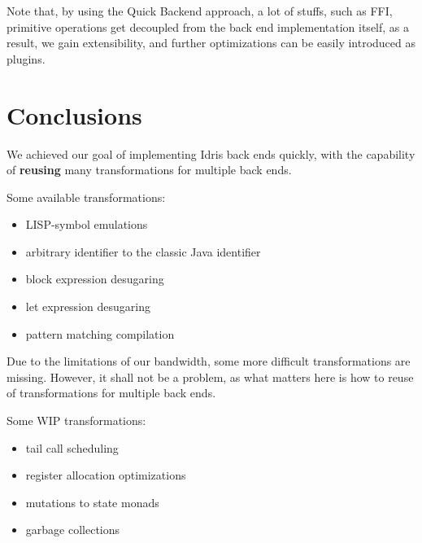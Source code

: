 \documentclass[a1,portrait]{a1poster}
\begin{document}
\begin{multicols}{2}
Note that, by using the Quick Backend approach, a lot of stuffs,
such as FFI, primitive operations get decoupled from the back end implementation itself,
as a result, we gain extensibility,
and further optimizations can be easily introduced as plugins.

\section*{Conclusions}

We achieved our goal of implementing Idris back ends quickly, with the capability of \textbf{reusing} many transformations for multiple back ends.

\begin{multicols}{2}

\begin{minipage}[t]{0.9\linewidth}
Some available transformations:
\begin{itemize}
    \setlength\itemsep{-0.2em}
    \item LISP-symbol emulations
    \item arbitrary identifier to the classic Java identifier
    \item block expression desugaring
    \item let expression desugaring
    \item pattern matching compilation
\end{itemize}
\end{minipage}

\begin{minipage}[t]{0.8\linewidth}
Due to the limitations of our bandwidth, some more difficult transformations are missing.
However, it shall not be a problem, as what matters here is how to reuse of transformations for multiple back ends.

Some WIP transformations:
\begin{itemize}
    \setlength\itemsep{-0.2em}
    \item tail call scheduling
    \item register allocation optimizations
    \item mutations to state monads
    \item garbage collections
\end{itemize}
\end{minipage}

\end{multicols}

\vspace{-1cm}


\end{multicols}
\end{document}
